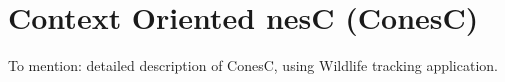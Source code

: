 \section{Context Oriented nesC (ConesC)}
To mention: detailed description of ConesC, using Wildlife tracking application.